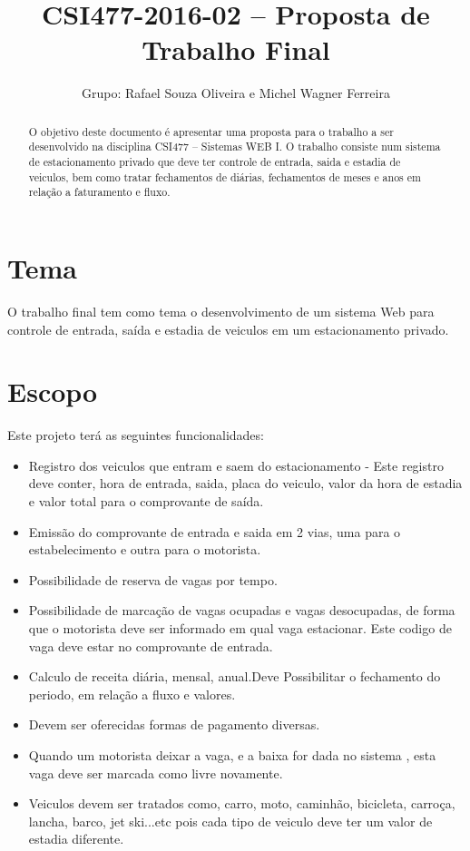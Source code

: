 \documentclass[10pt,a4paper,article]{abntex2}
\author{Grupo: Rafael Souza Oliveira e Michel Wagner Ferreira}
\title{CSI477-2016-02 -- Proposta de Trabalho Final}
\begin{document}
	\maketitle

	\begin{abstract}
		O objetivo deste documento é apresentar uma proposta para o trabalho a ser desenvolvido na disciplina CSI477 -- Sistemas WEB I.  O trabalho consiste num sistema de estacionamento privado que deve ter controle de entrada, saida e estadia de veiculos, bem como tratar fechamentos de diárias, fechamentos de meses e anos em relação a faturamento e fluxo.
	\end{abstract}		
	
	\section{Tema}
	
	O trabalho final tem como tema o desenvolvimento de um sistema Web para controle de entrada, saída e estadia de veiculos em um estacionamento privado.
		
	\section{Escopo}
	
		Este projeto terá as seguintes funcionalidades:
\begin{itemize}
	\item Registro dos veiculos que entram e saem do estacionamento - Este registro deve conter, hora de entrada, saida, placa do veiculo, valor da hora de estadia e valor total para o comprovante de saída.
	\item Emissão do comprovante de entrada e saida em 2 vias, uma para o estabelecimento e outra para o motorista.
	\item Possibilidade de reserva de vagas por tempo.
	\item Possibilidade de marcação de vagas ocupadas e vagas desocupadas, de forma que o motorista deve ser informado em qual vaga estacionar. Este codigo de vaga deve estar no comprovante de entrada.
	\item Calculo de receita diária, mensal, anual.Deve Possibilitar o fechamento do periodo, em relação a fluxo e valores.
	\item Devem ser oferecidas formas de pagamento diversas.
	\item Quando um motorista deixar a vaga, e a baixa for dada no sistema , esta vaga deve ser marcada como livre novamente.
	\item Veiculos devem ser tratados como, carro, moto, caminhão, bicicleta, carroça, lancha, barco, jet ski...etc pois cada tipo de veiculo deve ter um valor de estadia diferente.
\end{itemize}
\end{document}
